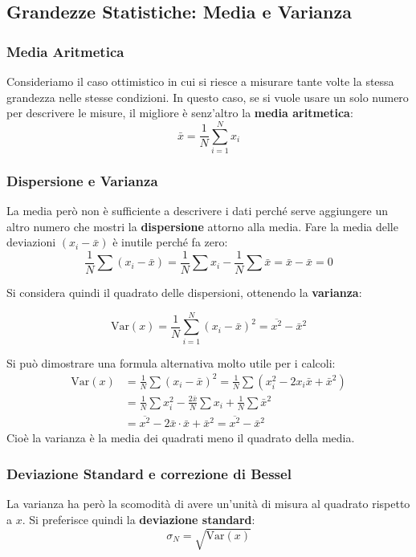 \documentclass[a4paper,11pt]{article}
\theoremstyle{remark}
\begin{document}
\subsection{Grandezze Statistiche: Media e Varianza}
\subsubsection{Media Aritmetica}

Consideriamo il caso ottimistico in cui si riesce a misurare tante volte la stessa grandezza nelle stesse condizioni. In questo caso, se si vuole usare un solo numero per descrivere le misure, il migliore è senz'altro la \textbf{media aritmetica}:
\begin{equation}
    \bar{x} = \frac{1}{N} \sum_{i=1}^{N} x_i
\end{equation}


\subsubsection{Dispersione e Varianza}
La media però non è sufficiente a descrivere i dati perché serve aggiungere un altro numero che mostri la \textbf{dispersione} attorno alla media. Fare la media delle deviazioni $(x_i - \bar{x})$ è inutile perché fa zero:
\[ \frac{1}{N} \sum (x_i - \bar{x}) = \frac{1}{N} \sum x_i - \frac{1}{N} \sum \bar{x} = \bar{x} - \bar{x} = 0 \]

Si considera quindi il quadrato delle dispersioni, ottenendo la \textbf{varianza}:

\begin{equation}
    \text{Var}(x) = \frac{1}{N} \sum_{i=1}^{N} (x_i - \bar{x})^2 = \overline{x^2} - \bar{x}^2
\end{equation}


Si può dimostrare una formula alternativa molto utile per i calcoli:
\begin{align*}
    \text{Var}(x) &= \frac{1}{N} \sum (x_i - \bar{x})^2 = \frac{1}{N} \sum (x_i^2 - 2x_i\bar{x} + \bar{x}^2) \\
    &= \frac{1}{N} \sum x_i^2 - \frac{2\bar{x}}{N} \sum x_i + \frac{1}{N} \sum \bar{x}^2 \\
    &= \overline{x^2} - 2\bar{x} \cdot \bar{x} + \bar{x}^2 = \overline{x^2} - \bar{x}^2
\end{align*}
Cioè la varianza è la media dei quadrati meno il quadrato della media.

\subsubsection{Deviazione Standard e correzione di Bessel}
La varianza ha però la scomodità di avere un'unità di misura al quadrato rispetto a $x$. Si preferisce quindi la \textbf{deviazione standard}:
\[ \sigma_N = \sqrt{\text{Var}(x)} \]
\end{document}
